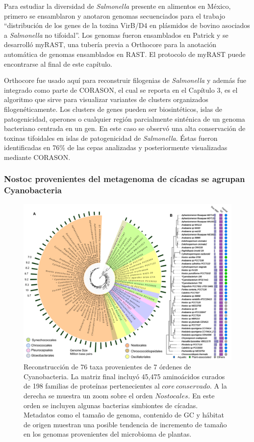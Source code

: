\documentclass[]{article}
\begin{document}
Para estudiar la diversidad de \emph{Salmonella} presente en alimentos
en México, primero se ensamblaron y anotaron genomas secuenciados para
el trabajo ``distribución de los genes de la toxina VirB/D4 en plásmidos
de bovino asociados a \emph{Salmonella} no tifoidal''. Los genomas
fueron ensamblados en Patrick y se desarrolló myRAST, una tubería previa
a Orthocore para la anotación automática de genomas ensamblados en RAST.
El protocolo de myRAST puede encontrarse al final de este capítulo.

Orthocore fue usado aquí para reconstruir filogenias de
\emph{Salmonella} y además fue integrado como parte de CORASON, el cual
se reporta en el Capítulo 3, es el algoritmo que sirve para visualizar
variantes de clusters organizados filogenéticamente. Los clusters de
genes pueden ser biosintéticos, islas de patogenicidad, operones o
cualquier región parcialmente sinténica de un genoma bacteriano centrada
en un gen. En este caso se observó una alta conservación de toxinas
tifoidales en islas de patogenicidad de \emph{Salmonella}. Éstas fueron
identificadas en 76\% de las cepas analizadas y posteriormente
visualizadas mediante CORASON.

\subsubsection{Nostoc provenientes del metagenoma de cícadas se agrupan
Cyanobacteria}\label{nostoc-provenientes-del-metagenoma-de-cicadas-se-agrupan-cyanobacteria}

\begin{figure}[h!tbp]
\centering
\includegraphics[angle = 0,scale = .45]{chapter1/Nostoc.png}
\caption[Arbol filogenético de $Nostoc$ construido utilizando  la selección de genes del $core~conservado$]{\footnotesize{Reconstrucción de 76 taxa provenientes de 7 órdenes de Cyanobacteria. La matriz final incluyó 45,475 aminoácidos curados de 198 familias de proteínas pertenecientes al $core~conservado$. A la derecha se muestra un zoom sobre el orden $Nostocales$. En este orden se incluyen algunas bacterias simbiontes de cícadas. Metadatos como el tamaño de genoma, contenido de GC y hábitat de origen muestran una posible tendencia de incremento de tamaño en los genomas provenientes del microbioma de plantas.}}
\label{fig:ArbolNostoc}
\end{figure}
\end{document}
